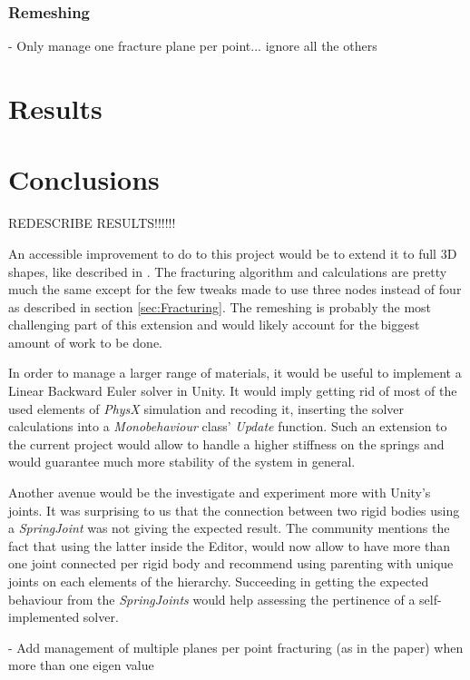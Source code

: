 \documentclass[tog]{acmsiggraph}
\begin{document}
\subsubsection{Remeshing}
- Only manage one fracture plane per point... ignore all the others

\section{Results}



\section{Conclusions}

REDESCRIBE RESULTS!!!!!!

An accessible improvement to do to this project would be to extend it to full 3D shapes, like described in \cite{Obrien:1999:GMA}. The fracturing algorithm and calculations are pretty much the same except for the few tweaks made to use three nodes instead of four as described in section \ref{sec:Fracturing}. The remeshing is probably the most challenging part of this extension and would likely account for the biggest amount of work to be done. 

In order to manage a larger range of materials, it would be useful to implement a Linear Backward Euler solver in Unity. It would imply getting rid of most of the used elements of \textit{PhysX} simulation and recoding it, inserting the solver calculations into a \textit{Monobehaviour} class' \textit{Update} function. Such an extension to the current project would allow to handle a higher stiffness on the springs and would guarantee much more stability of the system in general. 

Another avenue would be the investigate and experiment more with Unity's joints. It was surprising to us that the connection between two rigid bodies using a \textit{SpringJoint} was not giving the expected result. The community mentions the fact that using the latter inside the Editor, would now allow to have more than one joint connected per rigid body and recommend using parenting with unique joints on each elements of the hierarchy. Succeeding in getting the expected behaviour from the \textit{SpringJoints} would help assessing the pertinence of a self-implemented solver.  

- Add management of multiple planes per point fracturing (as in the paper) when more than one eigen value
\end{document}
